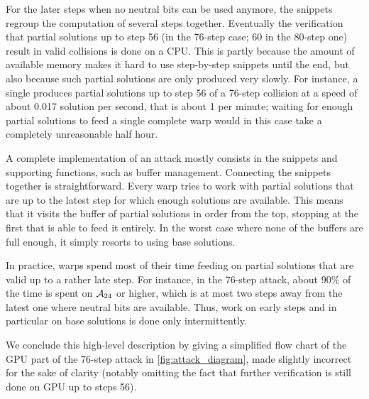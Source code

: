 For the
later steps when no neutral bits can be used anymore, the snippets regroup the computation of several steps together.
Eventually the verification that partial solutions up to step 56 (in the 76-step case; 60 in the 80-step one) result in valid collisions is done on a CPU. This is partly because
the amount of available memory makes it hard to use step-by-step snippets until the end, but also because such partial solutions are only
produced very slowly. For instance, a single \gtx produces partial solutions up to step 56 of a 76-step collision at a speed of about 0.017 solution per second, that is about
1 per minute; waiting for enough partial solutions to feed a single complete warp would in this case take a completely unreasonable half hour.

\bigskip


A complete implementation of an attack mostly consists in the snippets and supporting functions, such as buffer management.
Connecting the snippets together is straightforward. Every warp tries to work with partial solutions that are up
to the latest step for which enough solutions are available. This means that it visits the buffer of partial solutions in order from the top,
stopping at the first that is able to feed it entirely.
In the worst case where none of the buffers are full enough, it simply resorts to using base solutions.

In practice, warps spend most of their time feeding on partial solutions that are valid up to a rather late step. For instance, in the 76-step attack,
about 90\% of the time is spent on $\mathcal{A}_{24}$ or higher, which is at most two steps away from the latest one where neutral bits are available.
Thus, work on early steps and in particular on base solutions is done only intermittently.

We conclude this high-level description by giving a simplified flow chart
of the GPU part of the 76-step attack in \autoref{fig:attack_diagram}, made slightly incorrect for the sake of clarity (notably omitting the fact that further verification is still done on GPU up to steps 56).

\def\rectanMac{\begin{tikzpicture}[scale=0.2]\draw (0,0) rectangle (1,1);\end{tikzpicture}}
\def\elliMac{\begin{tikzpicture}[scale=0.3,transform shape]\node[draw,ellipse] (e) at (0,0) {\phantom{toto}};\end{tikzpicture}}
\def\plainMac{\begin{tikzpicture}[scale=0.1] \draw[>=latex,->] (0,0) -- (2,2);\end{tikzpicture}}
\def\dottMac{\begin{tikzpicture}[scale=0.1] \draw[dotted,->]   (0,0) -- (2,2);\end{tikzpicture}}

